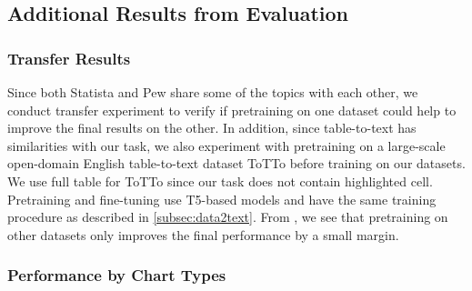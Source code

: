 \subsection{Additional Results from Evaluation}
\label{app:results}
\subsubsection{Transfer Results}
\label{app:transfer}



\begin{table}[t]
    \centering
    \vspace{-0.5em}
    \caption{\small Results measured by BLEU for transferability based on the T5 model. }
    \label{tab:transfer}
\end{table}



{Since both Statista and Pew share some of the topics with each other, we conduct transfer experiment to verify if pretraining on one dataset could help to improve the final results on the other. In addition, since table-to-text has similarities with our task, we also experiment with pretraining on a large-scale open-domain English table-to-text dataset ToTTo \cite{parikh2020totto} before training on our datasets. We use full table for ToTTo since our task does not contain highlighted cell. Pretraining and fine-tuning use T5-based models and have the same training procedure as described in \cref{subsec:data2text}. From , we see that pretraining on other datasets only improves the final performance by a small margin. }


\subsubsection{Performance by Chart Types}
\label{app:charttype}


